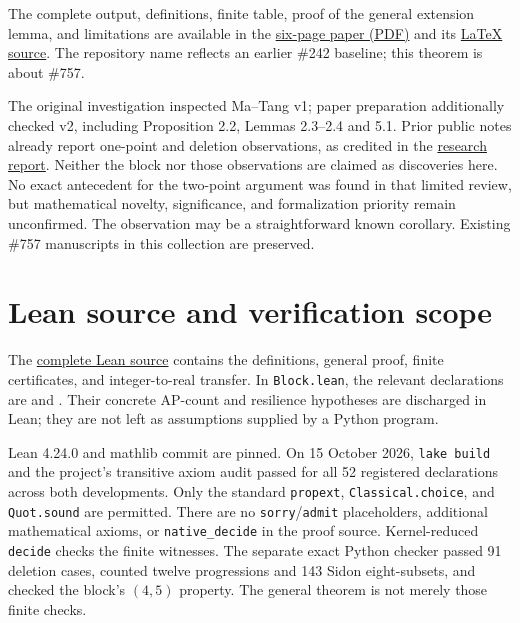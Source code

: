 \documentclass[11pt]{article}
\begin{document}
The complete output, definitions, finite table, proof of the general extension
lemma, and limitations are available in the
\href{https://github.com/salemon/erdos-242/blob/ca3f08715aeffb98581410a67bff9d02fb9ecbfe/paper/erdos757.pdf}{six-page paper (PDF)}
and its
\href{https://github.com/salemon/erdos-242/blob/ca3f08715aeffb98581410a67bff9d02fb9ecbfe/paper/erdos757.tex}{LaTeX source}.
The repository name reflects an earlier \#242 baseline; this theorem is
about \#757.

The original investigation inspected Ma--Tang v1; paper preparation additionally
checked v2, including Proposition 2.2, Lemmas 2.3--2.4 and 5.1.
Prior public notes already report one-point and deletion observations, as
credited in the
\href{https://github.com/salemon/erdos-242/blob/ca3f08715aeffb98581410a67bff9d02fb9ecbfe/docs/757/REPORT.md}{research report}.
Neither the block nor those observations are claimed as discoveries here.
No exact antecedent for the two-point argument was found in that limited
review, but mathematical novelty, significance, and formalization priority
remain unconfirmed. The observation may be a straightforward known corollary.
Existing \#757 manuscripts in this collection are preserved.

\section{Lean source and verification scope}
The
\href{https://github.com/salemon/erdos-242/tree/ca3f08715aeffb98581410a67bff9d02fb9ecbfe/Erdos757}{complete Lean source}
contains the definitions, general proof, finite certificates, and
integer-to-real transfer. In \texttt{Block.lean}, the relevant declarations are
 and
.
Their concrete AP-count and resilience hypotheses are discharged in Lean;
they are not left as assumptions supplied by a Python program.

Lean 4.24.0 and mathlib commit
 are pinned.
On 15 October 2026, \texttt{lake build} and the project's transitive axiom
audit passed for all 52 registered declarations across both developments.
Only the standard \texttt{propext}, \texttt{Classical.choice}, and
\texttt{Quot.sound} are permitted. There are no \texttt{sorry}/\texttt{admit}
placeholders, additional mathematical axioms, or \texttt{native\_decide}
in the proof source. Kernel-reduced \texttt{decide} checks the finite witnesses.
The separate exact Python checker passed 91 deletion cases, counted twelve
progressions and 143 Sidon eight-subsets, and checked the block's $(4,5)$
property. The general theorem is not merely those finite checks.
\end{document}
